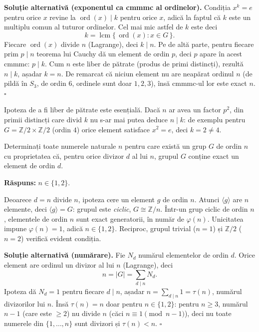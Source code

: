 \medskip
\noindent\textbf{Soluție alternativă (exponentul ca cmmmc al ordinelor).}\enspace
Condiția $x^{k}=e$ pentru orice $x$ revine la $\operatorname{ord}(x)\mid k$
pentru orice $x$, adică la faptul că $k$ este un multiplu comun al
tuturor ordinelor. Cel mai mic astfel de $k$ este deci
\[
  k = \operatorname{lcm}\{\,\operatorname{ord}(x) : x\in G\,\}.
\]
Fiecare $\operatorname{ord}(x)$ divide $n$ (Lagrange), deci $k\mid n$. Pe de
altă parte, pentru fiecare prim $p\mid n$ teorema lui Cauchy dă un
element de ordin $p$, deci $p$ apare în acest cmmmc: $p\mid k$. Cum $n$
este liber de pătrate (produs de primi distincți), rezultă
$n\mid k$, așadar $k=n$. De remarcat că niciun element nu are
neapărat ordinul $n$ (de pildă în $S_{3}$, de ordin $6$, ordinele
sunt doar $1,2,3$), însă cmmmc-ul lor este exact $n$.
\hfill$\square$

\begin{obs}
Ipoteza de a fi liber de pătrate este esențială. Dacă $n$
ar avea un factor $p^{2}$, din primii distincți care divid $k$ nu s-ar
mai putea deduce $n \mid k$: de exemplu pentru $G=\mathbb{Z}/2\times\mathbb{Z}/2$
(ordin $4$) orice element satisface $x^{2}=e$, deci $k=2 \neq 4$.
\end{obs}

\begin{problema}
Determinați toate numerele naturale $n$ pentru care există un grup
$G$ de ordin $n$ cu proprietatea că, pentru orice divizor $d$ al lui
$n$, grupul $G$ conține exact un element de ordin $d$.
\end{problema}

\noindent\textbf{Răspuns:} $n \in \{1,2\}$.

\begin{solutie}
Deoarece $d=n$ divide $n$, ipoteza cere un element $g$ de ordin $n$. Atunci
$\langle g\rangle$ are $n$ elemente, deci $\langle g\rangle=G$: grupul este
\emph{ciclic}, $G\cong\mathbb{Z}/n$. Într-un grup ciclic de ordin $n$,
elementele de ordin $n$ sunt exact generatorii, în număr de
$\varphi(n)$. Unicitatea impune $\varphi(n)=1$, adică $n\in\{1,2\}$.
Reciproc, grupul trivial ($n=1$) și $\mathbb{Z}/2$ ($n=2$) verifică
evident condiția.
\end{solutie}

\medskip
\noindent\textbf{Soluție alternativă (numărare).}\enspace
Fie $N_{d}$ numărul elementelor de ordin $d$. Orice element are ordinul
un divizor al lui $n$ (Lagrange), deci
\[
  n = |G| = \sum_{d \mid n} N_{d} .
\]
Ipoteza dă $N_{d}=1$ pentru fiecare $d\mid n$, așadar
$n=\sum_{d\mid n}1=\tau(n)$, numărul divizorilor lui $n$. Însă
$\tau(n)=n$ doar pentru $n\in\{1,2\}$: pentru $n\ge 3$, numărul $n-1$
(care este $\ge 2$) nu divide $n$ (căci $n\equiv 1 \pmod{n-1}$), deci nu
toate numerele din $\{1,\dots,n\}$ sunt divizori și $\tau(n)<n$.
\hfill$\square$

